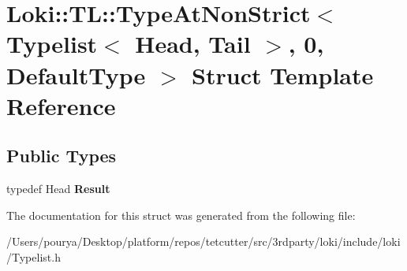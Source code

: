 \hypertarget{structLoki_1_1TL_1_1TypeAtNonStrict_3_01Typelist_3_01Head_00_01Tail_01_4_00_010_00_01DefaultType_01_4}{}\section{Loki\+:\+:T\+L\+:\+:Type\+At\+Non\+Strict$<$ Typelist$<$ Head, Tail $>$, 0, Default\+Type $>$ Struct Template Reference}
\label{structLoki_1_1TL_1_1TypeAtNonStrict_3_01Typelist_3_01Head_00_01Tail_01_4_00_010_00_01DefaultType_01_4}
\subsection*{Public Types}
\begin{DoxyCompactItemize}
\item 
\hypertarget{structLoki_1_1TL_1_1TypeAtNonStrict_3_01Typelist_3_01Head_00_01Tail_01_4_00_010_00_01DefaultType_01_4_a7df26331a43aa0b34cb70208e915efd7}{}typedef Head {\bfseries Result}\label{structLoki_1_1TL_1_1TypeAtNonStrict_3_01Typelist_3_01Head_00_01Tail_01_4_00_010_00_01DefaultType_01_4_a7df26331a43aa0b34cb70208e915efd7}

\end{DoxyCompactItemize}


The documentation for this struct was generated from the following file\+:\begin{DoxyCompactItemize}
\item 
/\+Users/pourya/\+Desktop/platform/repos/tetcutter/src/3rdparty/loki/include/loki/Typelist.\+h\end{DoxyCompactItemize}

